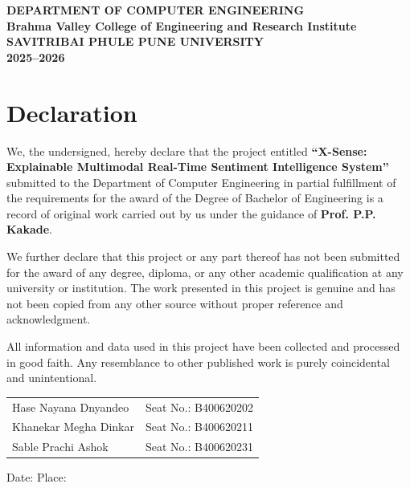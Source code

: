 \documentclass[12pt, a4paper]{report}
\newcommand{\projecttitle}{X-Sense: Explainable Multimodal Real-Time Sentiment Intelligence System}
\newcommand{\collegename}{Brahma Valley College of Engineering and Research Institute}
\newcommand{\universityname}{Savitribai Phule Pune University}
\begin{document}
\vfill

\begin{center}
{\normalsize \textbf{DEPARTMENT OF COMPUTER ENGINEERING}}\\[0.2cm]
{\normalsize \textbf{\collegename}}\\[0.3cm]
{\normalsize \textbf{\MakeUppercase{\universityname}}}\\[0.2cm]
{\normalsize \textbf{2025--2026}}
\end{center}

\newpage
\chapter*{Declaration}

We, the undersigned, hereby declare that the project entitled \textbf{``\projecttitle''} submitted to the Department of Computer Engineering in partial fulfillment of the requirements for the award of the Degree of Bachelor of Engineering is a record of original work carried out by us under the guidance of \textbf{{Prof. P.P. Kakade}}.

We further declare that this project or any part thereof has not been submitted for the award of any degree, diploma, or any other academic qualification at any university or institution. The work presented in this project is genuine and has not been copied from any other source without proper reference and acknowledgment.

All information and data used in this project have been collected and processed in good faith. Any resemblance to other published work is purely coincidental and unintentional.

\vspace{1.5cm}

\vspace{0.8cm}
\begin{flushright}
\begin{tabular}{l l}
{Hase Nayana Dnyandeo} & Seat No.: {B400620202} \\[0.15cm]
{Khanekar Megha Dinkar} & Seat No.: {B400620211} \\[0.15cm]
{Sable Prachi Ashok} & Seat No.: {B400620231} \\[0.15cm]
\end{tabular}

\vspace{1.5cm}
Date: \underline{\hspace{4cm}} \hspace{1cm} Place: \underline{\hspace{4cm}}
\end{flushright}
\newpage
\end{document}
